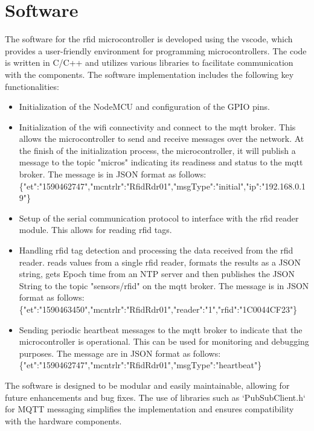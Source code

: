\section{Software}
The software for the \gls{rfid} microcontroller is developed using the \gls{vscode}, which provides a user-friendly environment for programming microcontrollers. The code is written in C/C++ and utilizes various libraries to facilitate communication with the components.
The software implementation includes the following key functionalities:
\begin{itemize}
  \item Initialization of the NodeMCU and configuration of the GPIO pins.
  \item Initialization of the \gls{wifi} connectivity and connect to the \gls{mqtt} broker. This allows the microcontroller to send and receive messages over the network.
  At the finish of the initialization process, the microcontroller, it will publish a message to the topic "micros" indicating its readiness and status to the \gls{mqtt} broker. The message is in JSON format as follows:\\
  \{"et":"1590462747","mcntrlr":"RfidRdr01","msgType":"initial","ip":"192.168.0.19"\}
\item Setup of the serial communication protocol to interface with the \gls{rfid} reader module. This allows for reading \gls{rfid} tags.
\item Handling \gls{rfid} tag detection and processing the data received from the \gls{rfid} reader. reads values from a single \gls{rfid} reader, formats the results as a JSON string, gets Epoch time from an NTP server and then publishes the JSON String to the topic "sensors/rfid" on the \gls{mqtt} broker. The message is in JSON format as follows:\\
\{"et":"1590463450","mcntrlr":"RfidRdr01","reader":"1","rfid":"1C0044CF23"\}
\item Sending periodic heartbeat messages to the \gls{mqtt} broker to indicate that the microcontroller is operational. This can be used for monitoring and debugging purposes. The message are in JSON format as follows:\\
\{"et":"1590462747","mcntrlr":"RfidRdr01","msgType":"heartbeat"\}
\end{itemize}
The software is designed to be modular and easily maintainable, allowing for future enhancements and bug fixes. The use of libraries such as `PubSubClient.h` for MQTT messaging simplifies the implementation and ensures compatibility with the hardware components.
